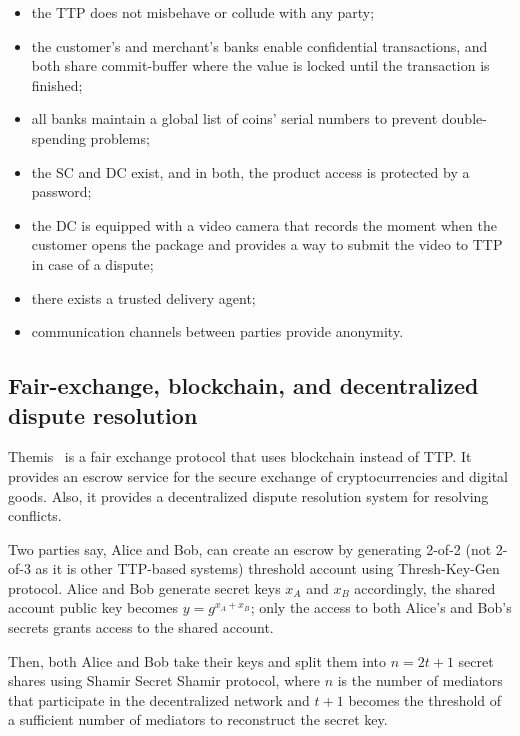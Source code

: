 \documentclass{ieeeaccess}
\begin{document}
\begin{itemize}
    \item the TTP does not misbehave or collude with any party;
    \item the customer's and merchant's banks enable confidential transactions, and both share commit-buffer where the value is locked until the transaction is finished;
    \item all banks maintain a global list of coins' serial numbers to prevent double-spending problems;
    \item the SC and DC exist, and in both, the product access is protected by a password;
    \item the DC is equipped with a video camera that records the moment when the customer opens the package and provides a way to submit the video to TTP in case of a dispute;
    \item there exists a trusted delivery agent;
    \item communication channels between parties provide anonymity.
\end{itemize}

\subsection{Fair-exchange, blockchain, and decentralized dispute resolution}
\label{themis-towards-decentralized-escrow-of-cryptocurrencies-without-trusted-third-parties}

Themis~\cite{mengThemisDecentralizedEscrow2019} is a fair exchange protocol that uses blockchain instead of TTP. It provides an escrow service for the secure exchange of cryptocurrencies and digital goods. Also, it provides a decentralized dispute resolution system for resolving conflicts.

Two parties say, Alice and Bob, can create an escrow by generating
2-of-2 (not 2-of-3 as it is other TTP-based systems) threshold account
using Thresh-Key-Gen protocol. Alice and Bob generate secret keys
\(x_A\) and \(x_B\) accordingly, the shared account public key becomes
\(y = g^{x_A+x_B}\); only the access to both Alice's and Bob's secrets
grants access to the shared account.

Then, both Alice and Bob take their keys and split them into
\(n=2t+1\) secret shares using Shamir Secret Shamir protocol, where
\(n\) is the number of mediators that participate in the decentralized
network and \(t+1\) becomes the threshold of a sufficient number of mediators to reconstruct the secret key.
\end{document}
